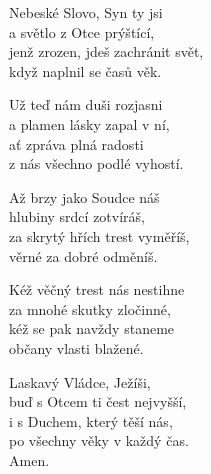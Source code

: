 \begin{translatioMulticol}{5}
Nebeské Slovo, Syn ty jsi\\
a světlo z Otce prýštící,\\
jenž zrozen, jdeš zachránit svět,\\
když naplnil se časů věk.\columnbreak

Už teď nám duši rozjasni\\
a plamen lásky zapal v ní,\\
ať zpráva plná radosti\\
z nás všechno podlé vyhostí.\columnbreak

Až brzy jako Soudce náš\\
hlubiny srdcí zotvíráš,\\
za skrytý hřích trest vyměříš,\\
věrné za dobré odměníš.\columnbreak

Kéž věčný trest nás nestihne\\
za mnohé skutky zločinné,\\
kéž se pak navždy staneme\\
občany vlasti blažené.\columnbreak

Laskavý Vládce, Ježíši,\\
buď s Otcem ti čest nejvyšší,\\
i s Duchem, který těší nás,\\
po všechny věky v každý čas.\\
Amen.
\end{translatioMulticol}
